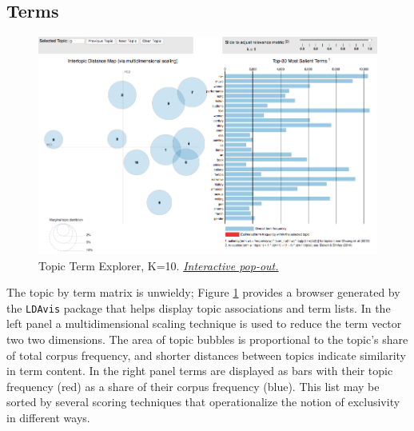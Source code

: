 \documentclass[]{book}
\theoremstyle{definition}
\theoremstyle{definition}
\theoremstyle{definition}
\theoremstyle{remark}
\begin{document}
\hypertarget{terms}{%
\subsection{Terms}\label{terms}}




\begin{figure}

{\centering \includegraphics[width=0.9\linewidth]{img/genr-mod-viz} 

}

\caption{Topic Term Explorer, K=10.
\href{ldaviz/viz/index.html}{\emph{Interactive pop-out.}}}\label{fig:genr-mod-viz}
\end{figure}

The topic by term matrix is unwieldy; Figure \ref{fig:genr-mod-viz}
provides a browser generated by the \texttt{LDAvis} package that helps
display topic associations and term lists. In the left panel a
multidimensional scaling technique is used to reduce the term vector two
two dimensions. The area of topic bubbles is proportional to the topic's
share of total corpus frequency, and shorter distances between topics
indicate similarity in term content. In the right panel terms are
displayed as bars with their topic frequency (red) as a share of their
corpus frequency (blue). This list may be sorted by several scoring
techniques that operationalize the notion of exclusivity in different
ways.
\end{document}
